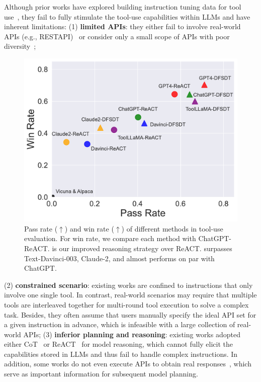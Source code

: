 Although prior works have explored building instruction tuning data for tool use~\citep{li2023api,patil2023gorilla,tang2023toolalpaca,xu2023tool}, they fail to fully stimulate the tool-use capabilities within LLMs and have inherent limitations: (1) \textbf{limited APIs}: they either fail to involve real-world APIs (e.g., RESTAPI)~\citep{patil2023gorilla,tang2023toolalpaca} or consider only a small scope of APIs with poor diversity~\citep{patil2023gorilla,xu2023tool,li2023api};
\begin{figure}
  \begin{center}
    \includegraphics[width=\linewidth]{figs/toolllama_scatterplot.pdf}
  \end{center}
  \caption{
    \small{Pass rate ($\uparrow$) and win rate ($\uparrow$) of different methods in tool-use evaluation. For win rate, we compare each method with ChatGPT-ReACT. \dfs is our improved reasoning strategy over ReACT. \ourmodel surpasses Text-Davinci-003, Claude-2, and almost performs on par with ChatGPT.}
    }
    \label{fig:show_figure}
\end{figure}
(2) \textbf{constrained scenario}: existing works are confined to instructions that only involve one single tool. In contrast, real-world scenarios may require that multiple tools are interleaved together for multi-round tool execution to solve a complex task. Besides, they often assume that users manually specify the ideal API set for a given instruction in advance, which is infeasible with a large collection of real-world APIs; (3) \textbf{inferior planning and reasoning}: existing works adopted either CoT~\citep{wei2023chainofthought} or ReACT~\citep{yao2022react} for model reasoning, which cannot fully elicit the capabilities stored in LLMs and thus fail to handle complex instructions. 
In addition, some works do not even execute APIs to obtain real responses~\citep{patil2023gorilla,tang2023toolalpaca}, which serve as important information for subsequent model planning.

